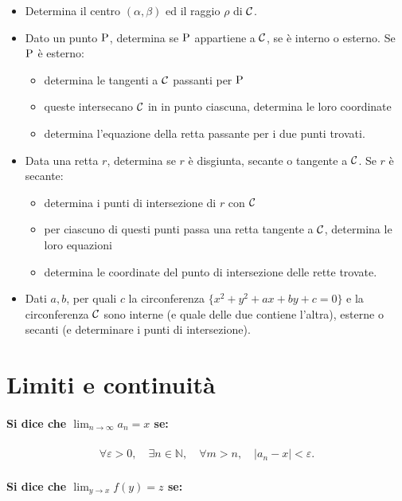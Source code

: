 \documentclass{article}
\begin{document}
\begin{itemize}
\item Determina il centro $(\alpha, \beta)$ ed il raggio $\rho$ di $\cal C$.
\item Dato un punto ${\rm P}$, determina se $\rm P$ appartiene a $\cal C$, se è interno o esterno. Se $\rm P$ è esterno:
\begin{itemize}
\item determina le tangenti a $\cal C$ passanti per $\rm P$
\item queste intersecano $\cal C$ in in punto ciascuna, determina le loro coordinate
\item determina l'equazione della retta passante per i due punti trovati.
\end{itemize}
\item Data una retta $r$, determina se $r$ è disgiunta, secante o tangente a $\cal C$. Se $r$ è secante:
\begin{itemize}
\item determina i punti di intersezione di $r$ con $\cal C$
\item per ciascuno di questi punti passa una retta tangente a $\cal C$, determina le loro equazioni
\item determina le coordinate del punto di intersezione delle rette trovate.
\end{itemize}
\item Dati $a, b$, per quali $c$ la circonferenza $\{x^2 + y^2 + a x + b y + c = 0\}$ e la circonferenza $\cal C$ sono interne (e quale delle due contiene l'altra), esterne o secanti (e determinare i punti di intersezione).
\end{itemize}

\newpage
\section*{Limiti e continuità}

\paragraph{Si dice che $\lim_{n \to \infty} a_n = x$ se:}

\begin{align*}
\forall \varepsilon > 0, \quad \exists n \in \mathbb N, \quad \forall m > n, \quad |a_n - x| < \varepsilon.
\end{align*}

\paragraph{Si dice che $\lim_{y \rightarrow x} f(y) = z$ se:}
\end{document}
